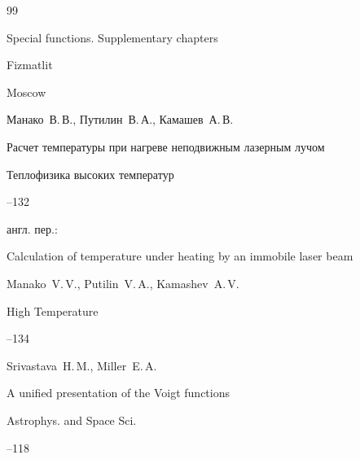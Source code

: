 \begin{thebibliography}{99}

\volinfo Special functions. Supplementary chapters

\publ Fizmatlit

\publaddr Moscow






\by Манако~В.\,В., Путилин~В.\,А., Камашев~А.\,В.

\paper Расчет температуры при нагреве неподвижным лазерным лучом

\jour Теплофизика высоких температур




--132

\transl

англ. пер.:~

\paper Calculation of temperature under heating by an immobile laser beam

\by Manako~V.\,V., Putilin~V.\,A., Kamashev~A.\,V.

\jour High Temperature




--134






\by Srivastava~H.\,M., Miller~E.\,A.  

\paper A unified presentation of the Voigt functions

\jour Astrophys. and Space Sci.




--118





\end{thebibliography}





\noindent

\hskip6.5cm \thedate \par\noindent

\hskip6.5cm\therevdate



\pagebreak






{}





\makeengtitlem



\newpage



%

